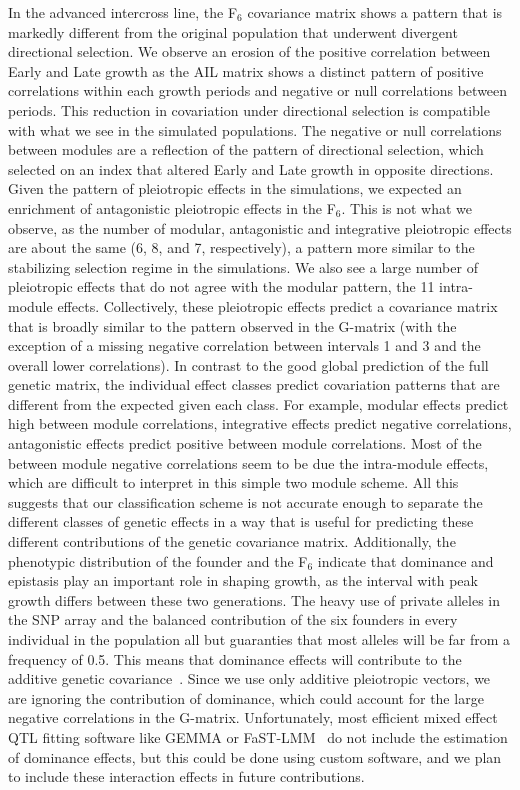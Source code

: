 \begin{refsection}
In the advanced intercross line, the F$_{\text{6}}$ covariance
matrix shows a pattern that is markedly different from the original population
that underwent divergent directional selection. We
observe an erosion of the positive correlation between Early and Late growth
as the AIL matrix shows a distinct pattern of positive correlations within
each growth periods and negative or null correlations between periods. This
reduction in covariation under directional selection is compatible with what
we see in the simulated populations. The negative or null correlations between
modules are a reflection of the pattern of directional selection, which
selected on an index that altered Early and Late growth in opposite
directions. Given the pattern of pleiotropic effects in the simulations, we
expected an enrichment of antagonistic pleiotropic effects in the
F$_{\text{6}}$. This is not what we observe, as the number of modular,
antagonistic and integrative pleiotropic effects are about the same (6, 8, and
7, respectively), a pattern more similar to the stabilizing selection regime
in the simulations. We also see a large number of pleiotropic effects that do
not agree with the modular pattern, the 11 intra-module effects. Collectively,
these pleiotropic effects predict a covariance matrix that is broadly similar
to the pattern observed in the G-matrix (with the exception of a missing
negative correlation between intervals 1 and 3 and the overall lower
correlations). In contrast to the good global prediction of the full genetic
matrix, the individual effect classes predict covariation patterns that are
different from the expected given each class. For example, modular effects
predict high between module correlations, integrative effects predict negative
correlations, antagonistic effects predict positive between module
correlations. Most of the between module negative correlations seem to be due
the intra-module effects, which are difficult to interpret in this simple two
module scheme. All this suggests that our classification scheme is not
accurate enough to separate the different classes of genetic effects in a way
that is useful for predicting these different contributions of the genetic
covariance matrix. Additionally, the phenotypic distribution of the founder
and the F$_{\text{6}}$ indicate that dominance and epistasis play an important
role in shaping growth, as the interval with peak growth differs between these
two generations. The heavy use of private alleles in the SNP array and the
balanced contribution of the six founders in every individual in the
population all but guaranties that most alleles will be far from a frequency
of 0.5. This means that dominance effects will contribute to the additive
genetic covariance~\parencite{Falconer1978-kq, Lynch1998-ql}. Since we use
only additive pleiotropic vectors, we are ignoring the contribution of
dominance, which could account for the large negative correlations in the
G-matrix. Unfortunately, most efficient mixed effect QTL fitting software like
GEMMA or FaST-LMM~\parencite{Lippert2011-jn} do not include the estimation of
dominance effects, but this could be done using custom software, and we plan
to include these interaction effects in future contributions. 


\end{refsection}

